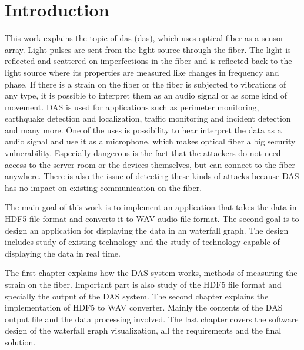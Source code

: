 \chapter*{Introduction}
{}

This work explains the topic of \acs{das} (\acl{das}), which uses optical fiber as a sensor array. Light pulses are sent from the light source through the fiber. The light is reflected and scattered on imperfections in the fiber and is reflected back to the light source where its properties are measured like changes in frequency and phase. If there is a strain on the fiber or the fiber is subjected to vibrations of any type, it is possible to interpret them as an audio signal or as some kind of movement. DAS is used for applications such as perimeter monitoring, earthquake detection and localization, traffic monitoring and incident detection and many more. One of the uses is possibility to hear interpret the data as a audio signal and use it as a microphone, which makes optical fiber a big security vulnerability. Especially dangerous is the fact that the attackers do not need access to the server room or the devices themselves, but can connect to the fiber anywhere. There is also the issue of detecting these kinds of attacks because DAS has no impact on existing communication on the fiber.

The main goal of this work is to implement an application that takes the data in HDF5 file format and converts it to WAV audio file format. The second goal is to design an application for displaying the data in an waterfall graph. The design includes study of existing technology and the study of technology capable of displaying the data in real time.


The first chapter explains how the DAS system works, methods of measuring the strain on the fiber. Important part is also study of the HDF5 file format and specially the output of the DAS system. The second chapter explains the implementation of HDF5 to WAV converter. Mainly the contents of the DAS output file and the data processing involved. The last chapter covers the software design of the waterfall graph visualization, all the requirements and the final solution.










